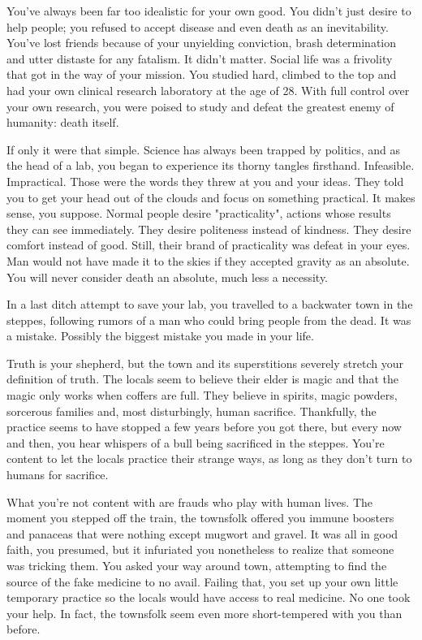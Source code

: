 \documentclass[char]{Pestilence}
\begin{document}
\name{\cOutsider{}}

You've always been far too idealistic for your own good. You didn't just desire to help people; you refused to accept disease and even death as an inevitability. You've lost friends because of your unyielding conviction, brash determination and utter distaste for any fatalism. It didn't matter. Social life was a frivolity that got in the way of your mission. You studied hard, climbed to the top and had your own clinical research laboratory at the age of 28. With full control over your own research, you were poised to study and defeat the greatest enemy of humanity: death itself.

If only it were that simple. Science has always been trapped by politics, and as the head of a lab, you began to experience its thorny tangles firsthand. Infeasible. Impractical. Those were the words they threw at you and your ideas. They told you to get your head out of the clouds and focus on something practical. It makes sense, you suppose. Normal people desire "practicality", actions whose results they can see immediately. They desire politeness instead of kindness. They desire comfort instead of good. Still, their brand of practicality was defeat in your eyes. Man would not have made it to the skies if they accepted gravity as an absolute. You will never consider death an absolute, much less a necessity.

In a last ditch attempt to save your lab, you travelled to a backwater town in the steppes, following rumors of a man who could bring people from the dead. It was a mistake. Possibly the biggest mistake you made in your life.

Truth is your shepherd, but the town and its superstitions severely stretch your definition of truth. The locals seem to believe their elder is magic and that the magic only works when \cElder{\their} coffers are full. They believe in spirits, magic powders, sorcerous families and, most disturbingly, human sacrifice. Thankfully, the practice seems to have stopped a few years before you got there, but every now and then, you hear whispers of a bull being sacrificed in the steppes. You're content to let the locals practice their strange ways, as long as they don't turn to humans for sacrifice.

What you're not content with are frauds who play with human lives. The moment you stepped off the train, the townsfolk offered you immune boosters and panaceas that were nothing except mugwort and gravel. It was all in good faith, you presumed, but it infuriated you nonetheless to realize that someone was tricking them. You asked your way around town, attempting to find the source of the fake medicine to no avail. Failing that, you set up your own little temporary practice so the locals would have access to real medicine. No one took your help. In fact, the townsfolk seem even more short-tempered with you than before.
\end{document}
